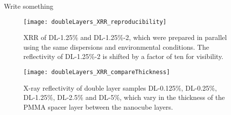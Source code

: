\documentclass[\main/dresen_thesis.tex]{subfiles}
\begin{document}
  \label{sec:doublelayers:layers:pnr}
  Write something

  \begin{figure}[tb]
    \centering
    \texttt{[image: doubleLayers\_XRR\_reproducibility]}
    \caption{\label{fig:doublelayers:xrr:reproducibility}XRR of DL-1.25\% and DL-1.25\%-2, which were prepared in parallel using the same dispersions and environmental conditions. The reflectivity of DL-1.25\%-2 is shifted by a factor of ten for visibility.}
  \end{figure}

  \begin{figure}[tb]
    \centering
    \texttt{[image: doubleLayers\_XRR\_compareThickness]}
    \caption{\label{fig:doublelayers:xrr:thicknessComparison}X-ray reflectivity of double layer samples DL-0.125\%, DL-0.25\%, DL-1.25\%, DL-2.5\% and DL-5\%, which vary in the thickness of the PMMA spacer layer between the nanocube layers.}
  \end{figure}
  

\end{document}
